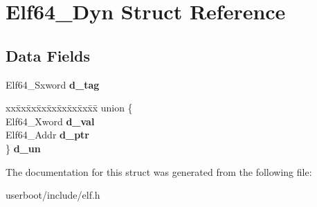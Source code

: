 \hypertarget{structElf64__Dyn}{}\section{Elf64\+\_\+\+Dyn Struct Reference}
\label{structElf64__Dyn}
\subsection*{Data Fields}
\begin{DoxyCompactItemize}
\item 
Elf64\+\_\+\+Sxword {\bfseries d\+\_\+tag}\hypertarget{structElf64__Dyn_a74a63e5acb7d8ddc946a5b0c5eb3c26a}{}\label{structElf64__Dyn_a74a63e5acb7d8ddc946a5b0c5eb3c26a}

\item 
\begin{tabbing}
xx\=xx\=xx\=xx\=xx\=xx\=xx\=xx\=xx\=\kill
union \{\\
\>Elf64\_Xword {\bfseries d\_val}\\
\>Elf64\_Addr {\bfseries d\_ptr}\\
\} {\bfseries d\_un}\hypertarget{structElf64__Dyn_abd4b6c963d2e60adff51721717f6751f}{}\label{structElf64__Dyn_abd4b6c963d2e60adff51721717f6751f}
\\

\end{tabbing}\end{DoxyCompactItemize}


The documentation for this struct was generated from the following file\+:\begin{DoxyCompactItemize}
\item 
userboot/include/elf.\+h\end{DoxyCompactItemize}
